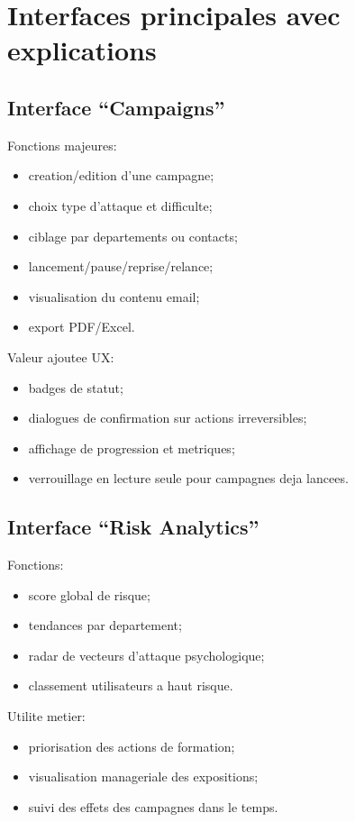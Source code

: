 \documentclass[12pt,a4paper,oneside]{report}
\begin{document}
\section{Interfaces principales avec explications}
\subsection{Interface ``Campaigns''}
Fonctions majeures:
\begin{itemize}[leftmargin=1.2cm]
  \item creation/edition d'une campagne;
  \item choix type d'attaque et difficulte;
  \item ciblage par departements ou contacts;
  \item lancement/pause/reprise/relance;
  \item visualisation du contenu email;
  \item export PDF/Excel.
\end{itemize}

Valeur ajoutee UX:
\begin{itemize}[leftmargin=1.2cm]
  \item badges de statut;
  \item dialogues de confirmation sur actions irreversibles;
  \item affichage de progression et metriques;
  \item verrouillage en lecture seule pour campagnes deja lancees.
\end{itemize}

\subsection{Interface ``Risk Analytics''}
Fonctions:
\begin{itemize}[leftmargin=1.2cm]
  \item score global de risque;
  \item tendances par departement;
  \item radar de vecteurs d'attaque psychologique;
  \item classement utilisateurs a haut risque.
\end{itemize}

Utilite metier:
\begin{itemize}[leftmargin=1.2cm]
  \item priorisation des actions de formation;
  \item visualisation manageriale des expositions;
  \item suivi des effets des campagnes dans le temps.
\end{itemize}
\end{document}
